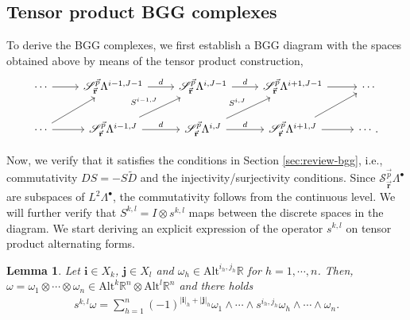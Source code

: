 \documentclass[final]{amsart}%
\newtheorem{lemma}{Lemma}
\newcommand{\charset}{X}
\newcommand{\0}{\mathaccent23}
\newcommand \alt{\mathrm{Alt}}
\newcommand\R{\mathbb{R}}
\newcommand{\bs}{{\scriptscriptstyle \bullet}}
\newcommand{\vbr}{\vec{\mathbf r}}
\newcommand{\vp}{\vec{p}}
\begin{document}
\subsection{Tensor product BGG complexes}


To derive the BGG complexes, we first establish a BGG diagram with the spaces obtained above by means of the tensor product construction,
\begin{equation}
 \label{BGGdiagram-general}
\begin{tikzcd}
\cdots \arrow{r} &\mathscr{S}_{\vbr}^{\vp}\Lambda^{i-1, J-1} \arrow{r}{d} &\mathscr{S}_{\vbr}^{\vp}\Lambda^{i, J-1} \arrow{r}{d} & \mathscr{S}_{\vbr}^{\vp}\Lambda^{i+1, J-1} \arrow{r}{} & \cdots \\
\cdots \arrow{r}\arrow[ur]&\mathscr{S}_{\vbr}^{\vp}\Lambda^{i-1, J}
\arrow{r}{d} \arrow[ur, "S^{i-1, J}"]&
\mathscr{S}_{\vbr}^{\vp}\Lambda^{i, J}  \arrow{r}{d} \arrow[ur, "S^{i, J}"]&\mathscr{S}_{\vbr}^{\vp}\Lambda^{i+1, J}  \arrow{r}{}\arrow[ur] &\cdots.
 \end{tikzcd}
\end{equation}

Now, we verify that it satisfies the conditions in Section \ref{sec:review-bgg}, i.e., commutativity $DS=-S\tilde{D}$ and the injectivity/surjectivity conditions.  
Since $\mathscr{S}_{\vbr}^{\vp}\Lambda^{\bs}$ are subspaces of $L^2\Lambda^{\bs}$, the commutativity follows from the continuous level. We will further verify that $S^{k, l}=I\otimes s^{k, l}$ maps between the discrete spaces in the diagram.
We start deriving an explicit expression of the operator $s^{k, l}$ on tensor product alternating forms.

\begin{lemma}\label{lem:s-tensorpro}
Let $\bm i\in \charset_{k}$, $\bm j\in \charset_{l}$ and $\omega_{h}\in \alt^{i_{h}, j_h}\R$ for $h=1, \cdots, n$. Then, $\omega=\omega_{1}\otimes \cdots \otimes \omega_{n}\in\alt^{k}\mathbb{R}^n\otimes \alt^l\mathbb{R}^n$ and there holds
\begin{gather*}
    s^{k, l}\omega
    = \sum_{h=1}^n (-1)^{|\bm{i}|_{h}+|\bm{j}|_{h}}
    \omega_1 \wedge \cdots \wedge 
    s^{i_h,j_h} \omega_h \wedge \cdots \wedge \omega_n.
\end{gather*}
\end{lemma}
\end{document}
